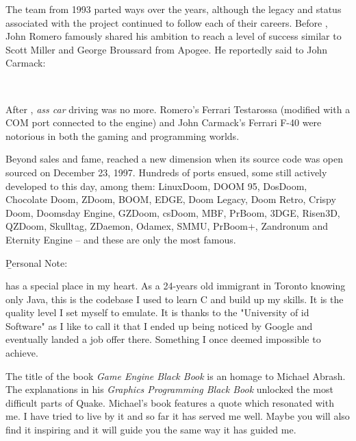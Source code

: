 \thispagestyle{plain} %




The \doom{} team from 1993 parted ways over the years, although the legacy and status associated with the project continued to follow each of their careers. Before \doom{}, John Romero famously shared his ambition to reach a level of success similar to Scott Miller and George Broussard from Apogee. He reportedly said to John Carmack: \\
\par
 \\
 \par
After \doom{}, \textit{ass car} driving was no more. Romero's Ferrari Testarossa (modified with a COM port connected to the engine) and John Carmack's Ferrari F-40 were notorious in both the gaming and programming worlds.\\
\par
Beyond sales and fame, \doom{} reached a new dimension when its source code was open sourced on December 23, 1997. Hundreds of ports ensued, some still actively developed to this day, among them: LinuxDoom, DOOM 95, DosDoom, Chocolate Doom, ZDoom, BOOM, EDGE, Doom Legacy, Doom Retro, Crispy Doom, Doomsday Engine, GZDoom, csDoom, MBF, PrBoom, 3DGE, Risen3D, QZDoom, Skulltag, ZDaemon, Odamex, SMMU, PrBoom+, Zandronum and Eternity Engine -- and these are only the most famous.\\
\par
\vspace{10pt}
\b{Personal Note:}\\
\par
\doom{} has a special place in my heart. As a 24-years old immigrant in Toronto knowing only Java, this is the codebase I used to learn C and build up my skills. It is the quality level I set myself to emulate. It is thanks to the "University of id Software" as I like to call it that I ended up being noticed by Google and eventually landed a job offer there. Something I once deemed impossible to achieve.\\
\par
The title of the book \textit{Game Engine Black Book} is an homage to Michael Abrash. The explanations in his \textit{Graphics Programming Black Book} unlocked the most difficult parts of Quake. Michael's book features a quote which resonated with me. I have tried to live by it and so far it has served me well. Maybe you will also find it inspiring and it will guide you the same way it has guided me.\\
\par
{}
\thispagestyle{plain} %
